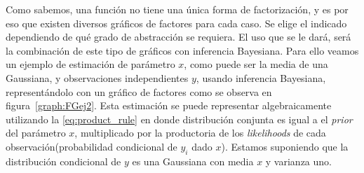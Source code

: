 \documentclass[11pt,twoside, spanish]{report} %
\begin{document}
Como sabemos, una funci\'on no tiene una \'unica forma de factorizaci\'on, y es por eso que existen diversos gr\'aficos de factores para cada caso.
Se elige el indicado dependiendo de qu\'e grado de abstracci\'on se requiera.
El uso que se le dar\'a, ser\'a la combinaci\'on de este tipo de gr\'aficos con inferencia Bayesiana.
Para ello veamos un ejemplo de estimaci\'on de par\'ametro $x$, como puede ser la media de una Gaussiana, y observaciones independientes $y$, usando inferencia Bayesiana, represent\'andolo con un gr\'afico de factores como se observa en figura~\ref{graph:FGej2}. 
Esta estimaci\'on se puede representar algebraicamente utilizando la \ref{eq:product_rule} en donde distribuci\'on conjunta es igual a el \textit{prior} del par\'ametro $x$, multiplicado por la productoria de los \emph{likelihoods} de cada observaci\'on(probabilidad condicional de $y_i$ dado $x$).
Estamos suponiendo que la distribuci\'on condicional de $y$ es una Gaussiana con media $x$ y varianza uno.
\end{document}
